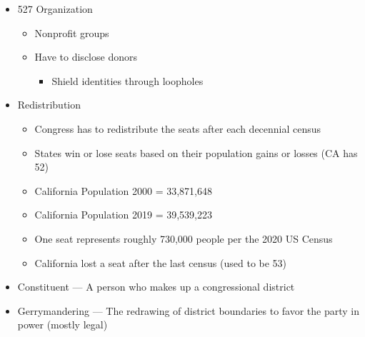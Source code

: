\documentclass[12pt]{article}
\begin{document}
\begin{itemize}
\begin{itemize}
    \end{itemize}

  \item 527 Organization

    \begin{itemize}

      \item Nonprofit groups

      \item Have to disclose donors

        \begin{itemize}

          \item Shield identities through loopholes

        \end{itemize}

    \end{itemize}

  \item Redistribution

    \begin{itemize}

      \item Congress has to redistribute the seats after each decennial census

      \item States win or lose seats based on their population gains or losses (CA has 52)

      \item California Population 2000 = 33,871,648

      \item California Population 2019 = 39,539,223

      \item One seat represents roughly 730,000 people per the 2020 US Census

      \item California lost a seat after the last census (used to be 53)

    \end{itemize}

  \item Constituent — A person who makes up a congressional district

  \item Gerrymandering — The redrawing of district boundaries to favor the party in power (mostly legal)

\end{itemize}
\end{document}
